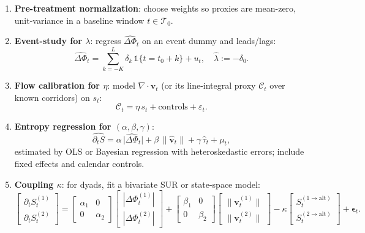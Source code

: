 \documentclass{article}
\begin{document}
\begin{enumerate}
\item \textbf{Pre-treatment normalization}: choose weights so proxies are mean-zero,
unit-variance in a baseline window $t \in \mathcal{T}_0$.
\item \textbf{Event-study for $\lambda$}: regress $\widehat{\Delta \Phi}_t$ on an event
dummy and leads/lags:
\[
\widehat{\Delta \Phi}_t = \sum_{k=-K}^L \delta_k \,\mathbb{1}\{t=t_0+k\} + u_t,
\quad \widehat{\lambda} := -\delta_0.
\]
\item \textbf{Flow calibration for $\eta$}: model $\nabla\cdot \widehat{\mathbf{v}}_t$
(or its line-integral proxy $\mathcal{C}_t$ over known corridors) on $s_t$:
\[
\mathcal{C}_t = \eta\, s_t + \text{controls} + \varepsilon_t.
\]
\item \textbf{Entropy regression for $(\alpha,\beta,\gamma)$}:
\[
\widehat{\partial_t S} =
\alpha\,\big|\widehat{\Delta \Phi}_t\big| + \beta\,\|\widehat{\mathbf{v}}_t\|
+ \gamma\,\widehat{\tau}_t + \mu_t,
\]
estimated by OLS or Bayesian regression with heteroskedastic errors; include
fixed effects and calendar controls.
\item \textbf{Coupling $\kappa$}: for dyads, fit a bivariate SUR or state-space model:
\[
\begin{bmatrix}
\partial_t S^{(1)}_t \\ \partial_t S^{(2)}_t
\end{bmatrix}
=
\begin{bmatrix}
\alpha_1 & 0 \\ 0 & \alpha_2
\end{bmatrix}
\begin{bmatrix}
|\Delta \Phi^{(1)}_t| \\ |\Delta \Phi^{(2)}_t|
\end{bmatrix}
+
\begin{bmatrix}
\beta_1 & 0 \\ 0 & \beta_2
\end{bmatrix}
\begin{bmatrix}
\|\mathbf{v}^{(1)}_t\| \\ \|\mathbf{v}^{(2)}_t\|
\end{bmatrix}
-
\kappa
\begin{bmatrix}
S^{(1\to \mathrm{alt})}_t \\ S^{(2\to \mathrm{alt})}_t
\end{bmatrix}
+
\boldsymbol{\epsilon}_t.
\]
\end{enumerate}
\end{document}
